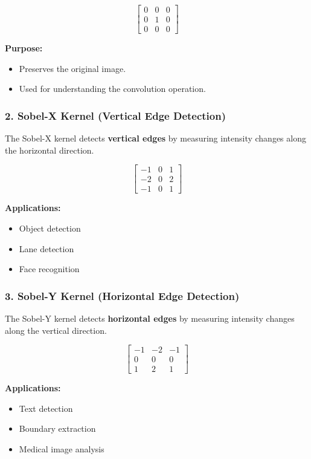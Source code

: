 \documentclass[11pt]{article}
\begin{document}
\[
\begin{bmatrix}
0 & 0 & 0\\
0 & 1 & 0\\
0 & 0 & 0
\end{bmatrix}
\]

\textbf{Purpose:}
\begin{itemize}
\item Preserves the original image.
\item Used for understanding the convolution operation.
\end{itemize}

\subsubsection*{2. Sobel-X Kernel (Vertical Edge Detection)}

The Sobel-X kernel detects \textbf{vertical edges} by measuring intensity changes along the horizontal direction.

\[
\begin{bmatrix}
-1 & 0 & 1\\
-2 & 0 & 2\\
-1 & 0 & 1
\end{bmatrix}
\]

\textbf{Applications:}
\begin{itemize}
\item Object detection
\item Lane detection
\item Face recognition
\end{itemize}

\subsubsection*{3. Sobel-Y Kernel (Horizontal Edge Detection)}

The Sobel-Y kernel detects \textbf{horizontal edges} by measuring intensity changes along the vertical direction.

\[
\begin{bmatrix}
-1 & -2 & -1\\
0 & 0 & 0\\
1 & 2 & 1
\end{bmatrix}
\]

\textbf{Applications:}
\begin{itemize}
\item Text detection
\item Boundary extraction
\item Medical image analysis
\end{itemize}
\end{document}
